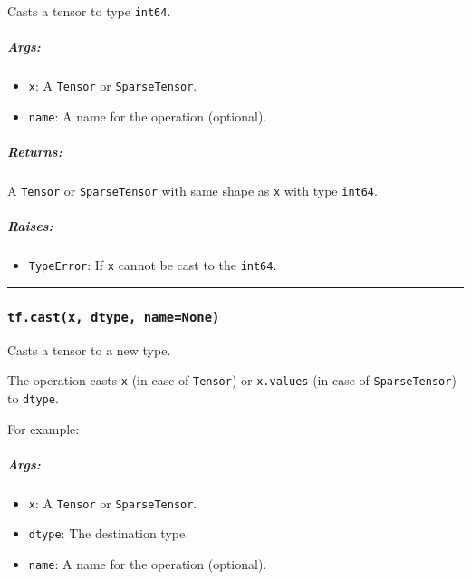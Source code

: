 Casts a tensor to type \lstinline{int64}.

\subparagraph{Args: }\label{args-5}

\begin{itemize}
\tightlist
\item
  \lstinline{x}: A \lstinline{Tensor} or \lstinline{SparseTensor}.
\item
  \lstinline{name}: A name for the operation (optional).
\end{itemize}

\subparagraph{Returns: }\label{returns-5}

A \lstinline{Tensor} or \lstinline{SparseTensor} with same shape as \lstinline{x}
with type \lstinline{int64}.

\subparagraph{Raises: }\label{raises-4}

\begin{itemize}
\tightlist
\item
  \lstinline{TypeError}: If \lstinline{x} cannot be cast to the
  \lstinline{int64}.
\end{itemize}

\begin{center}\rule{0.5\linewidth}{\linethickness}\end{center}

\subsubsection{\texorpdfstring{\lstinline{tf.cast(x, dtype, name=None)}
}{tf.cast(x, dtype, name=None) }}\label{tf.castx-dtype-namenone}

Casts a tensor to a new type.

The operation casts \lstinline{x} (in case of \lstinline{Tensor}) or
\lstinline{x.values} (in case of \lstinline{SparseTensor}) to \lstinline{dtype}.

For example:

\begin{Shaded}
\begin{Highlighting}[]
\OperatorTok{==>} \NormalTok{[}\NormalTok{, }\NormalTok{]  }
\end{Highlighting}
\end{Shaded}

\subparagraph{Args: }\label{args-6}

\begin{itemize}
\tightlist
\item
  \lstinline{x}: A \lstinline{Tensor} or \lstinline{SparseTensor}.
\item
  \lstinline{dtype}: The destination type.
\item
  \lstinline{name}: A name for the operation (optional).
\end{itemize}

